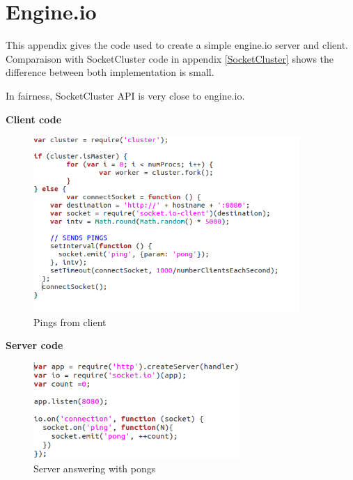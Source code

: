 \chapter{Engine.io}
\label{engine}

This appendix gives the code used to create a simple engine.io server and
client. Comparaison with SocketCluster code in appendix \ref{SocketCluster} 
shows the difference between both implementation is small. 

In fairness, SocketCluster API is very close to engine.io.

\textbf{Client code}

\begin{figure}[H]
	\centering
		\includegraphics[width=0.9\textwidth]{./Figures/engine_client_simplePong.png}
	\caption[engine_client_simplePing]{Pings from client}
	\label{fig:engine_client_simplePing}
\end{figure}


\textbf{Server code}


\begin{figure}[H]
	\centering
    \includegraphics[width=0.7\textwidth]{./Figures/engine_server_simplePing.png}
	\caption[engine_server_simplePong]{Server answering with pongs}
	\label{fig:engine_server_simplePong}
\end{figure}

